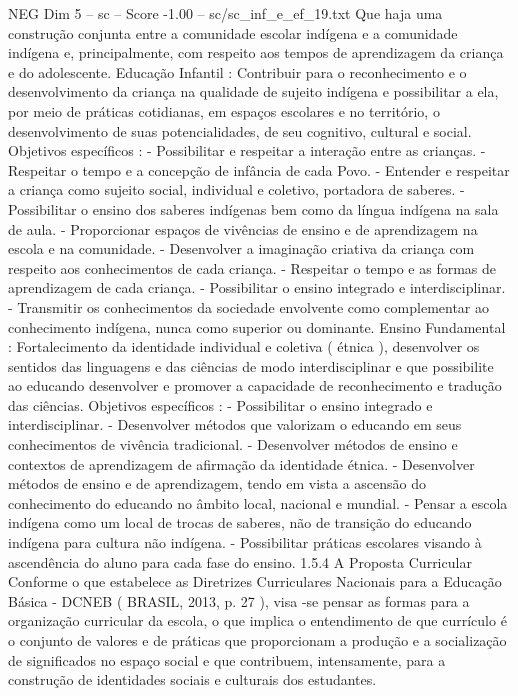 \begin{textsample}{NEG Dim 5 – sc – Score -1.00 – sc/sc\_inf\_e\_ef\_19.txt}
Que haja uma construção conjunta entre a comunidade escolar indígena e a comunidade indígena e, principalmente, com respeito aos tempos de aprendizagem da criança e do adolescente.
Educação Infantil : Contribuir para o reconhecimento e o desenvolvimento da criança na qualidade de sujeito indígena e possibilitar a ela, por meio de práticas cotidianas, em espaços escolares e no território, o desenvolvimento de suas potencialidades, de seu cognitivo, cultural e social.
Objetivos específicos : - Possibilitar e respeitar a interação entre as crianças. - Respeitar o tempo e a concepção de infância de cada Povo. - Entender e respeitar a criança como sujeito social, individual e coletivo, portadora de saberes. - Possibilitar o ensino dos saberes indígenas bem como da língua indígena na sala de aula. - Proporcionar espaços de vivências de ensino e de aprendizagem na escola e na comunidade. - Desenvolver a imaginação criativa da criança com respeito aos conhecimentos de cada criança. - Respeitar o tempo e as formas de aprendizagem de cada criança. - Possibilitar o ensino integrado e interdisciplinar. - Transmitir os conhecimentos da sociedade envolvente como complementar ao conhecimento indígena, nunca como superior ou dominante.
Ensino Fundamental : Fortalecimento da identidade individual e coletiva ( étnica ), desenvolver os sentidos das linguagens e das ciências de modo interdisciplinar e que possibilite ao educando desenvolver e promover a capacidade de reconhecimento e tradução das ciências.
Objetivos específicos : - Possibilitar o ensino integrado e interdisciplinar. - Desenvolver métodos que valorizam o educando em seus conhecimentos de vivência tradicional. - Desenvolver métodos de ensino e contextos de aprendizagem de afirmação da identidade étnica. - Desenvolver métodos de ensino e de aprendizagem, tendo em vista a ascensão do conhecimento do educando no âmbito local, nacional e mundial. - Pensar a escola indígena como um local de trocas de saberes, não de transição do educando indígena para cultura não indígena. - Possibilitar práticas escolares visando à ascendência do aluno para cada fase do ensino. 1.5.4 A Proposta Curricular Conforme o que estabelece as Diretrizes Curriculares Nacionais para a Educação Básica - DCNEB ( BRASIL, 2013, p. 27 ), visa -se pensar as formas para a organização curricular da escola, o que implica o entendimento de que currículo é o conjunto de valores e de práticas que proporcionam a produção e a socialização de significados no espaço social e que contribuem, intensamente, para a construção de identidades sociais e culturais dos estudantes.

\end{textsample}
